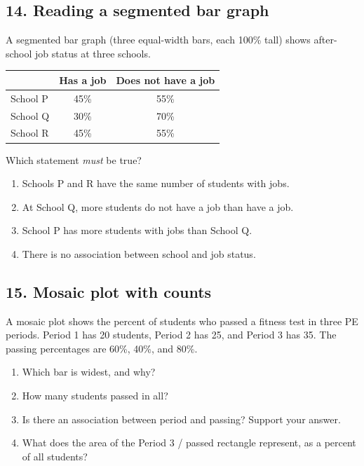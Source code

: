 \documentclass[11pt]{article}
\begin{document}
\subsection*{14. Reading a segmented bar graph}
A segmented bar graph (three equal-width bars, each 100\% tall) shows after-school job status at three schools.
\begin{center}
\begin{tabular}{l|cc}
 & Has a job & Does not have a job\\ \hline
School P & 45\% & 55\%\\
School Q & 30\% & 70\%\\
School R & 45\% & 55\%
\end{tabular}
\end{center}
Which statement \emph{must} be true?
\par\medskip
\begin{enumerate}[label=\Alph*),itemsep=4pt]
  \item Schools P and R have the same number of students with jobs.
  \item At School Q, more students do not have a job than have a job.
  \item School P has more students with jobs than School Q.
  \item There is no association between school and job status.
\end{enumerate}

\Needspace{2.6in}
\subsection*{15. Mosaic plot with counts}
A mosaic plot shows the percent of students who passed a fitness test in three PE periods. Period 1 has 20 students, Period 2 has 25, and Period 3 has 35. The passing percentages are 60\%, 40\%, and 80\%.
\begin{enumerate}[label=\alph*.]
  \item Which bar is widest, and why?\\[0.25in]
  \item How many students passed in all?\\[0.32in]
  \item Is there an association between period and passing? Support your answer.\\[0.32in]
  \item What does the area of the Period 3 / passed rectangle represent, as a percent of all students?\\[0.3in]
\end{enumerate}
\end{document}
